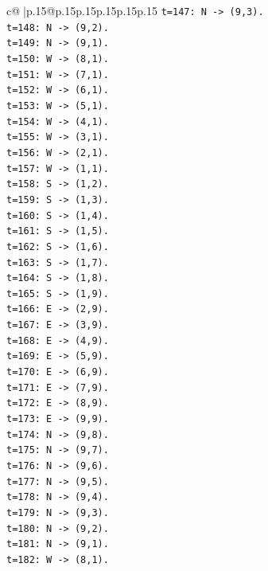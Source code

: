 \documentclass{article}
\begin{document}
{\begin{supertabular}{c@{$\;$}|p{.15\linewidth}@{}p{.15\linewidth}p{.15\linewidth}p{.15\linewidth}p{.15\linewidth}p{.15\linewidth}}
{{{\texttt{t=147: N {-}> (9,3).} \\
\texttt{t=148: N {-}> (9,2).} \\
\texttt{t=149: N {-}> (9,1).} \\
\texttt{t=150: W {-}> (8,1).} \\
\texttt{t=151: W {-}> (7,1).} \\
\texttt{t=152: W {-}> (6,1).} \\
\texttt{t=153: W {-}> (5,1).} \\
\texttt{t=154: W {-}> (4,1).} \\
\texttt{t=155: W {-}> (3,1).} \\
\texttt{t=156: W {-}> (2,1).} \\
\texttt{t=157: W {-}> (1,1).} \\
\texttt{t=158: S {-}> (1,2).} \\
\texttt{t=159: S {-}> (1,3).} \\
\texttt{t=160: S {-}> (1,4).} \\
\texttt{t=161: S {-}> (1,5).} \\
\texttt{t=162: S {-}> (1,6).} \\
\texttt{t=163: S {-}> (1,7).} \\
\texttt{t=164: S {-}> (1,8).} \\
\texttt{t=165: S {-}> (1,9).} \\
\texttt{t=166: E {-}> (2,9).} \\
\texttt{t=167: E {-}> (3,9).} \\
\texttt{t=168: E {-}> (4,9).} \\
\texttt{t=169: E {-}> (5,9).} \\
\texttt{t=170: E {-}> (6,9).} \\
\texttt{t=171: E {-}> (7,9).} \\
\texttt{t=172: E {-}> (8,9).} \\
\texttt{t=173: E {-}> (9,9).} \\
\texttt{t=174: N {-}> (9,8).} \\
\texttt{t=175: N {-}> (9,7).} \\
\texttt{t=176: N {-}> (9,6).} \\
\texttt{t=177: N {-}> (9,5).} \\
\texttt{t=178: N {-}> (9,4).} \\
\texttt{t=179: N {-}> (9,3).} \\
\texttt{t=180: N {-}> (9,2).} \\
\texttt{t=181: N {-}> (9,1).} \\
\texttt{t=182: W {-}> (8,1).} \\
}}}
\end{supertabular}}
\end{document}
